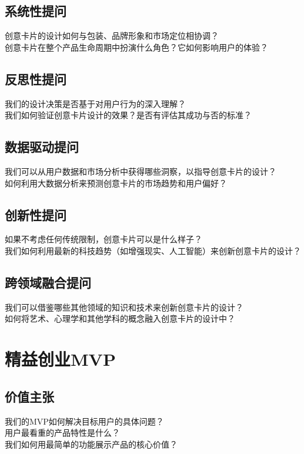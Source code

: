 \documentclass[12pt]{book}
\begin{document}
\subsection{系统性提问}
创意卡片的设计如何与包装、品牌形象和市场定位相协调？\\
创意卡片在整个产品生命周期中扮演什么角色？它如何影响用户的体验？\\

\subsection{反思性提问}
我们的设计决策是否基于对用户行为的深入理解？\\
我们如何验证创意卡片设计的效果？是否有评估其成功与否的标准？\\

\subsection{数据驱动提问}
我们可以从用户数据和市场分析中获得哪些洞察，以指导创意卡片的设计？\\
如何利用大数据分析来预测创意卡片的市场趋势和用户偏好？\\

\subsection{创新性提问}
如果不考虑任何传统限制，创意卡片可以是什么样子？\\
我们如何利用最新的科技趋势（如增强现实、人工智能）来创新创意卡片的设计？\\

\subsection{跨领域融合提问}
我们可以借鉴哪些其他领域的知识和技术来创新创意卡片的设计？\\
如何将艺术、心理学和其他学科的概念融入创意卡片的设计中？\\

\section{精益创业MVP}
\subsection{价值主张}
我们的MVP如何解决目标用户的具体问题？\\
用户最看重的产品特性是什么？\\
我们如何用最简单的功能展示产品的核心价值？\\
\end{document}
